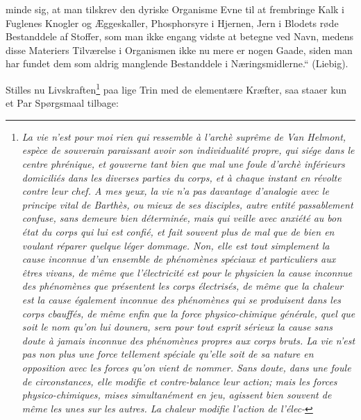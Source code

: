 \documentclass[12pt,a4paper]{book}
\begin{document}
minde sig, at man tilskrev den dyriske Organisme Evne til at
frembringe Kalk i Fuglenes Knogler og Æggeskaller,
Phosphorsyre i Hjernen, Jern i Blodets røde Bestanddele af Stoffer,
som man ikke engang vidste at betegne ved Navn, medens disse
Materiers Tilværelse i Organismen ikke nu mere er nogen Gaade, siden
man har fundet dem som aldrig manglende Bestanddele i
Næringsmidlerne.“ (Liebig).

\setcounter{footnote}{0}
Stilles nu Livskraften\footnote{\textit{La vie n'est pour moi rien
qui ressemble à l'arch\`e suprême de Van Helmont, espèce de souverain
paraissant avoir son individualité propre, qui siége dans le centre
phrénique, et gouverne tant bien que mal une foule
d'\emph{arch\`e} inférieurs domiciliés dans les diverses parties du
corps, et à chaque instant en révolte contre leur chef. A mes yeux,
la vie n'a pas davantage d'analogie avec \emph{le principe vital} de
Barthès, ou mieux de ses disciples, autre entité passablement
confuse, sans demeure bien déterminée, mais qui veille avec anxiété
au bon état du corps qui lui est confié, et fait souvent plus de mal
que de bien en voulant réparer quelque léger dommage. Non, elle est
tout simplement la cause inconnue d'un ensemble de phénomènes
spéciaux et particuliers aux êtres vivans, de même que l'électricité
est pour le physicien la cause inconnue des phénomènes que
présentent les corps électrisés, de même que la chaleur est la cause
également inconnue des phénomènes qui se produisent dans les corps
cbauffés, de même enfin que la force physico-chimique générale, quel
que soit le nom qu'on lui dounera, sera pour tout esprit sérieux la
cause sans doute à jamais inconnue des phénomènes propres aux corps
bruts. La vie n'est pas non plus une force tellement spéciale
qu'elle soit de sa nature en opposition avec les forces qu'on vient
de nommer. Sans doute, dans une foule de circonstances, elle modifie
et contre-balance leur action; mais les forces physico-chimiques,
mises simultanément en jeu, agissent bien souvent de même les unes
sur les autres. La chaleur modifie l'action de l'élec-}
} paa lige Trin med de elementære Kræfter, saa staaer kun et Par
Spørgsmaal tilbage:
\end{document}
